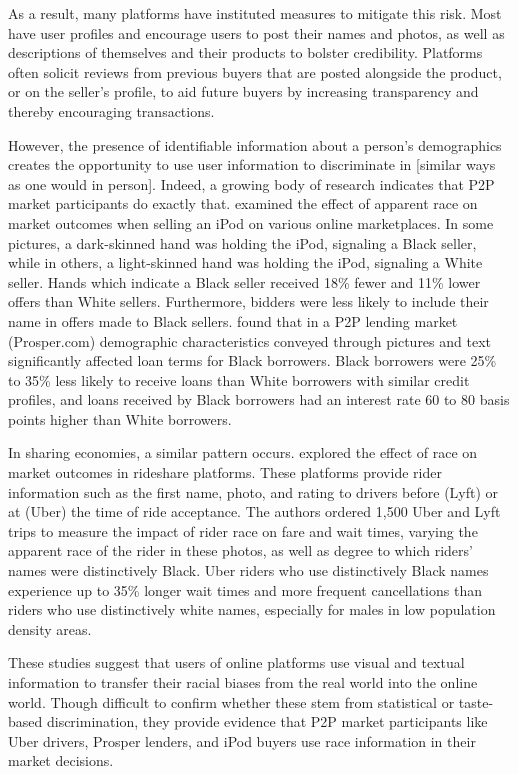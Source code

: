 As a result, many platforms have instituted measures to mitigate this risk. Most have user profiles and encourage users to post their names and photos, as well as descriptions of themselves and their products to bolster credibility. Platforms often solicit reviews from previous buyers that are posted alongside the product, or on the seller's profile, to aid future buyers by increasing transparency and thereby encouraging transactions. 

However, the presence of identifiable information about a person’s demographics creates the opportunity to use user information to discriminate in [similar ways as one would in person]. Indeed, a growing body of research indicates that P2P market participants do exactly that. \cite{doleac} examined the effect of apparent race on market outcomes when selling an iPod on various online marketplaces. In some pictures, a dark-skinned hand was holding the iPod, signaling a Black seller, while in others, a light-skinned hand was holding the iPod, signaling a White seller. Hands which indicate a Black seller received 18\% fewer and 11\% lower offers than White sellers. Furthermore, bidders were less likely to include their name in offers made to Black sellers. \cite{pope} found that in a P2P lending market (Prosper.com) demographic characteristics conveyed through pictures and text significantly affected loan terms for Black borrowers. Black borrowers were 25\% to 35\% less likely to receive loans than White borrowers with similar credit profiles, and loans received by Black borrowers had an interest rate 60 to 80 basis points higher than White borrowers.

In sharing economies, a similar pattern occurs. \cite{knittel} explored the effect of race on market outcomes in rideshare platforms. These platforms provide rider information such as the first name, photo, and rating to drivers before (Lyft) or at (Uber) the time of ride acceptance. The authors ordered 1,500 Uber and Lyft trips to measure the impact of rider race on fare and wait times, varying the apparent race of the rider in these photos, as well as degree to which riders’ names were distinctively Black. Uber riders who use distinctively Black names experience up to 35\% longer wait times and more frequent cancellations than riders who use distinctively white names, especially for males in low population density areas.

These studies suggest that users of online platforms use visual and textual information to transfer their racial biases from the real world into the online world. Though difficult to confirm whether these stem from statistical or taste-based discrimination, they provide evidence that P2P market participants like Uber drivers, Prosper lenders, and iPod buyers use race information in their market decisions. 



